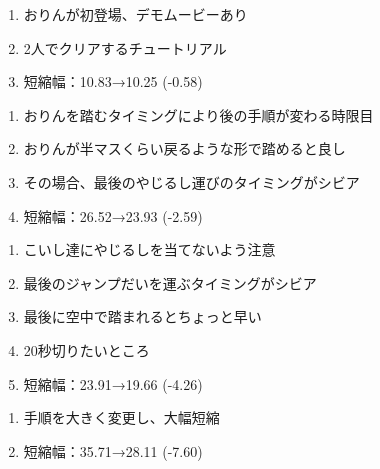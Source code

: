 \begin{enumerate}[label={\sarrow}]
\item おりんが初登場、デモムービーあり
\item 2人でクリアするチュートリアル
\item 短縮幅：10.83→10.25 (-0.58)
\end{enumerate}



\begin{enumerate}[label={\sarrow}]
\item おりんを踏むタイミングにより後の手順が変わる時限目
\item おりんが半マスくらい戻るような形で踏めると良し
\item その場合、最後のやじるし運びのタイミングがシビア
\item 短縮幅：26.52→23.93 (-2.59)
\end{enumerate}



\begin{enumerate}[label={\sarrow}]
\item こいし達にやじるしを当てないよう注意
\item 最後のジャンプだいを運ぶタイミングがシビア
\item 最後に空中で踏まれるとちょっと早い
\item 20秒切りたいところ
\item 短縮幅：23.91→19.66 (-4.26)
\end{enumerate}



\begin{enumerate}[label={\sarrow}]
\item 手順を大きく変更し、大幅短縮
\item 短縮幅：35.71→28.11 (-7.60)
\end{enumerate}



